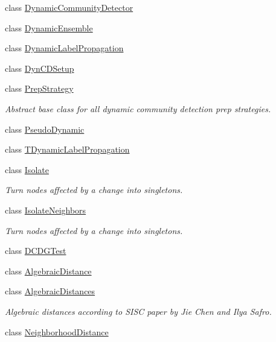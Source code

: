 \begin{DoxyCompactItemize}
\item 
class \hyperlink{class_networ_kit_1_1_dynamic_community_detector}{Dynamic\-Community\-Detector}
\item 
class \hyperlink{class_networ_kit_1_1_dynamic_ensemble}{Dynamic\-Ensemble}
\item 
class \hyperlink{class_networ_kit_1_1_dynamic_label_propagation}{Dynamic\-Label\-Propagation}
\item 
class \hyperlink{class_networ_kit_1_1_dyn_c_d_setup}{Dyn\-C\-D\-Setup}
\item 
class \hyperlink{class_networ_kit_1_1_prep_strategy}{Prep\-Strategy}
\begin{DoxyCompactList}\small\item\em Abstract base class for all dynamic community detection prep strategies. \end{DoxyCompactList}\item 
class \hyperlink{class_networ_kit_1_1_pseudo_dynamic}{Pseudo\-Dynamic}
\item 
class \hyperlink{class_networ_kit_1_1_t_dynamic_label_propagation}{T\-Dynamic\-Label\-Propagation}
\item 
class \hyperlink{class_networ_kit_1_1_isolate}{Isolate}
\begin{DoxyCompactList}\small\item\em Turn nodes affected by a change into singletons. \end{DoxyCompactList}\item 
class \hyperlink{class_networ_kit_1_1_isolate_neighbors}{Isolate\-Neighbors}
\begin{DoxyCompactList}\small\item\em Turn nodes affected by a change into singletons. \end{DoxyCompactList}\item 
class \hyperlink{class_networ_kit_1_1_d_c_d_g_test}{D\-C\-D\-G\-Test}
\item 
class \hyperlink{class_networ_kit_1_1_algebraic_distance}{Algebraic\-Distance}
\item 
class \hyperlink{class_networ_kit_1_1_algebraic_distances}{Algebraic\-Distances}
\begin{DoxyCompactList}\small\item\em Algebraic distances according to S\-I\-S\-C paper by Jie Chen and Ilya Safro. \end{DoxyCompactList}\item 
class \hyperlink{class_networ_kit_1_1_neighborhood_distance}{Neighborhood\-Distance}
\item 

\end{DoxyCompactItemize}
